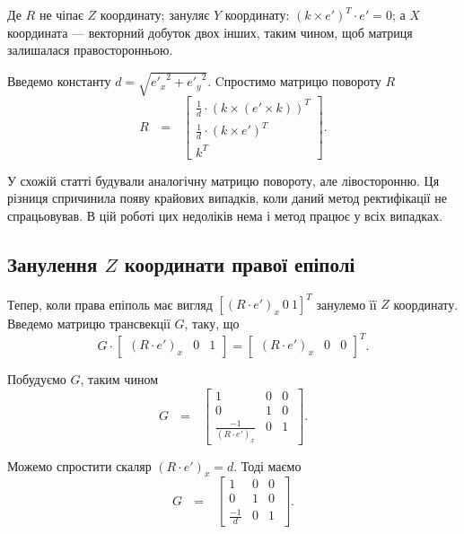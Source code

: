 Де $R$ не чіпає $Z$ координату; зануляє $Y$ координату: 
${(k \times e')}^T \cdot e' = 0$; а $X$ координата --- векторний добуток
двох інших, таким чином, щоб матриця залишалася правосторонньою.

Введемо константу $d = \sqrt{{e'_x}^2 + {e'_y}^2}$. Cпростимо матрицю повороту $R$
\begin{equation}
R \:\:\: = \:\:\:\left[
\begin{matrix}
\frac{1}{d} \cdot {(k \times (e' \times k))}^T\\
\frac{1}{d} \cdot {(k \times e')}^T\\
k^T\
\end{matrix}
\right].
\end{equation}

У схожій статті \cite{Nechaieva} будували аналогічну матрицю повороту, але 
лівосторонню. Ця різниця спричинила появу крайових випадків, коли даний 
метод ректифікації не спрацьовував. В цій роботі цих недоліків нема і 
метод працює у всіх випадках.


\subsection{Занулення $Z$ координати правої епіполі}
Тепер, коли права епіполь має вигляд ${[(R \cdot e')_x \: 0 \: 1]}^T$ 
занулемо її $Z$ координату. Введемо матрицю трансвекції $G$, таку, що
\begin{equation}
G \cdot 
\begin{bmatrix}
(R \cdot e')_x & 0 & 1
\end{bmatrix}
 = {
\begin{bmatrix}
(R \cdot e')_x & 0 & 0
\end{bmatrix}
}^T.
\end{equation}

Побудуємо $G$, таким чином 
\begin{equation}
G \:\:\: = \:\:\:\left[
\begin{matrix}
1 & 0 & 0\\
0 & 1 & 0\\
\frac{-1}{{(R \cdot e')}_x} & 0 & 1\
\end{matrix}
\right].
\end{equation}

Можемо спростити скаляр ${(R \cdot e')}_x = d$. Тоді маємо 
\begin{equation}
G \:\:\: = \:\:\:\left[
\begin{matrix}
1 & 0 & 0\\
0 & 1 & 0\\
\frac{-1}{d} & 0 & 1\
\end{matrix}
\right].
\end{equation}

